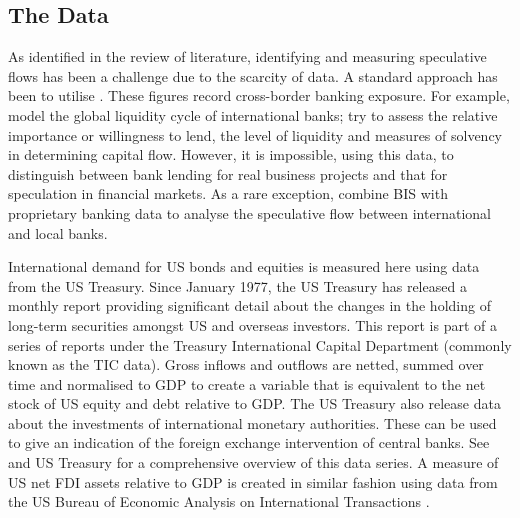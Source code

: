 \documentclass[jrfm,article,accept,moreauthors,pdftex]{Definitions/mdpi}
\begin{document}
\subsection{The Data}
As identified in the review of literature, identifying and measuring speculative flows has been a challenge due to the scarcity of data.  A standard approach has been to utilise \mbox{\citep{BISbanking}}. These figures record cross-border banking exposure.  For example, \citep{Bruno2014} model the global liquidity cycle of international banks; \citep{AdamsKaneGlobal} try to assess the relative importance or willingness to lend, the level of liquidity and measures of solvency in determining capital flow.  However, it is impossible, using this data, to distinguish between bank lending for real business projects and that for speculation in financial markets.  As a rare exception, \citep{Cerutti2014} combine BIS with proprietary banking data to analyse the speculative flow between international and local banks. 

International demand for US bonds and equities is measured here using data from the US Treasury. Since January 1977, the US Treasury has released a monthly report providing significant detail about the changes in the holding of long-term securities amongst US and overseas investors. This report is part of a series of reports under the Treasury International Capital Department (commonly known as the TIC data).  Gross inflows and outflows are netted, summed over time and normalised to GDP to create a variable that is equivalent to the net stock of US equity and debt relative to GDP.  The US Treasury also release data about the investments of international monetary authorities.  These can be used to give an indication of the foreign exchange intervention of central banks. See \citep{Siourounis2004Capital} and US Treasury \citep{TIC} for a comprehensive overview of this data series. A measure of US net FDI assets relative to GDP is created in similar fashion using data from the US Bureau of Economic Analysis on International Transactions \citep{BEA}. 
\end{document}
